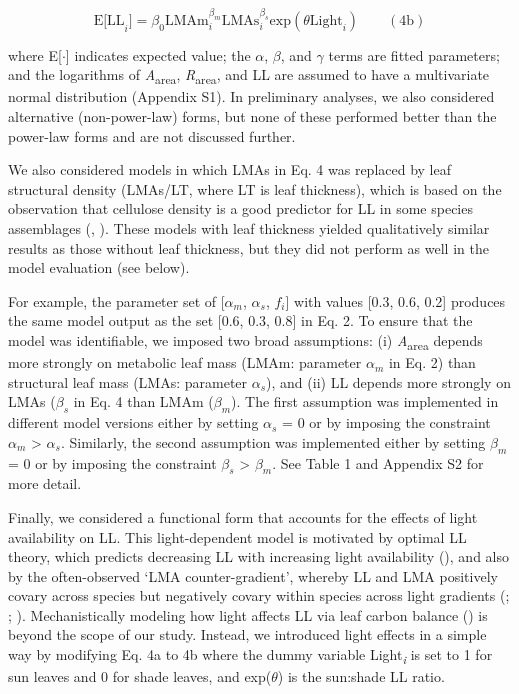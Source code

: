 \documentclass[
  12pt,
  letterpaper,
  DIV=11,
  numbers=noendperiod]{scrartcl}
\begin{document}
\[
\mathrm{E[LL}_i] = \beta_0\mathrm{LMAm}_{i}^{\beta_m} \mathrm{LMAs}_{i}^{\beta_s} \mathrm{exp}(\theta \mathrm{Light}_i) \qquad(4\mathrm{b})
\]

where E{[}\(\cdot\){]} indicates expected value; the \(\alpha\),
\(\beta\), and \(\gamma\) terms are fitted parameters; and the
logarithms of \emph{A}\textsubscript{area},
\emph{R}\textsubscript{area}, and LL are assumed to have a multivariate
normal distribution (Appendix S1). In preliminary analyses, we also
considered alternative (non-power-law) forms, but none of these
performed better than the power-law forms and are not discussed further.

We also considered models in which LMAs in Eq. 4 was replaced by leaf
structural density (LMAs/LT, where LT is leaf thickness), which is based
on the observation that cellulose density is a good predictor for LL in
some species assemblages (, ). These models with leaf
thickness yielded qualitatively similar results as those without leaf
thickness, but they did not perform as well in the model evaluation (see
below).

For example, the parameter set of {[}\(\alpha_m\), \(\alpha_s\),
\(f_i\){]} with values {[}0.3, 0.6, 0.2{]} produces the same model
output as the set {[}0.6, 0.3, 0.8{]} in Eq. 2. To ensure that the model
was identifiable, we imposed two broad assumptions: (i)
\emph{A}\textsubscript{area} depends more strongly on metabolic leaf
mass (LMAm: parameter \(\alpha_m\) in Eq. 2) than structural leaf mass
(LMAs: parameter \(\alpha_s\)), and (ii) LL depends more strongly on
LMAs (\(\beta_s\) in Eq. 4 than LMAm (\(\beta_m\)). The first assumption
was implemented in different model versions either by setting
\(\alpha_s\) = 0 or by imposing the constraint \(\alpha_m\)
\textgreater{} \(\alpha_s\). Similarly, the second assumption was
implemented either by setting \(\beta_m\) = 0 or by imposing the
constraint \(\beta_s\) \textgreater{} \(\beta_m\). See Table 1 and
Appendix S2 for more detail.

Finally, we considered a functional form that accounts for the effects
of light availability on LL. This light-dependent model is motivated by
optimal LL theory, which predicts decreasing LL with increasing light
availability (), and also by
the often-observed `LMA counter-gradient', whereby LL and LMA positively
covary across species but negatively covary within species across light
gradients (;
;
). Mechanistically
modeling how light affects LL via leaf carbon balance
() is beyond the scope of our
study. Instead, we introduced light effects in a simple way by modifying
Eq. 4a to 4b where the dummy variable Light\textsubscript{\emph{i}} is
set to 1 for sun leaves and 0 for shade leaves, and exp(\(\theta\)) is
the sun:shade LL ratio.
\end{document}
